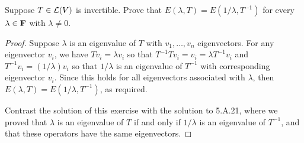 \begin{exercise}{9}
  Suppose $T\in\mathcal{L}(V)$ is invertible. Prove that $E(\lambda,T)=E(1/\lambda,T^{-1})$ for every $\lambda\in\mathbf{F}$ with $\lambda\neq 0$.
\end{exercise}
\begin{proof}
 Suppose $\lambda$ is an eigenvalue of $T$ with $v_1,\dots,v_n$ eigenvectors. For any eigenvector $v_i$, we have $Tv_i= \lambda v_i$ so that $T^{-1}Tv_i=v_i=\lambda T^{-1}v_i$ and $T^{-1}v_i=(1/\lambda)v_i$ so that $1/\lambda$ is an eigenvalue of $T^{-1}$  with corresponding eigenvector $v_i$. Since this holds for all eigenvectors associated with $\lambda$, then $E(\lambda,T)=E(1/\lambda, T^{-1})$, as required.

 Contrast the solution of this exercise with the solution to 5.A.21, where we proved that $\lambda$ is an eigenvalue of $T$ if and only if $1/\lambda$ is an eigenvalue of $T^{-1}$, and that these operators have the same eigenvectors.
\end{proof}

